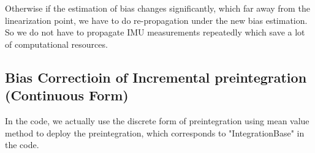 \documentclass[12pt]{article}   %
\begin{document}
Otherwise if the estimation of bias changes significantly, which far away from the linearization point, we have to do re-propagation under the new bias estimation. So we do not have to propagate IMU measurements repeatedly which save a lot of computational resources.



\subsection{Bias Correctioin of Incremental preintegration (Continuous Form)}

In the code, we actually use the discrete form of preintegration using mean value method to deploy the preintegration, 
which corresponds to "IntegrationBase" in the code.
\end{document}

